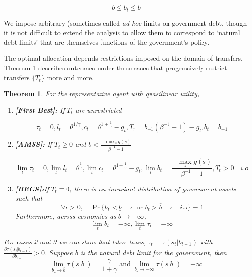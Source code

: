 \documentclass[thmsb,11pt]{article}
\newtheorem{theorem}{Theorem}
\begin{document}
\begin{equation}
\label{eq bounds}
\underline{b}\leq b_t\leq \overline{b}
\end{equation}

We impose arbitrary (sometimes called {\em ad hoc} limits on government debt, though it is not difficult to extend the analysis to allow
them to correspond to `natural debt limits' that are themselves functions  of the government's policy.

The optimal allocation depends  restrictions imposed on the domain of transfers. Theorem \ref{thm rep agent} describes outcomes under three cases that progressively restrict transfers $\{T_t\}$ more and more.


\begin{theorem}
\label{thm rep agent}
For the representative agent with quasilinear utility,

\begin{enumerate}


\item \textbf{[First Best]:} If $T_t$ are unrestricted

\[\tau_t=0,l_t=\theta^{1/\gamma},c_t=\theta^{1+ \frac{1}{\gamma}}-g_t,T_t=b_{-1}(\beta^{-1}-1)-g_t,b_t=b_{-1}\]


\item \textbf{[AMSS]:} If $T_t\geq 0$ and $\underline{b}<\frac{-\max_{s}g(s)}{\beta^{-1}-1}$

\[\lim_t \tau_t=0, \lim_t l_t=\theta^{\frac{1}{\gamma}},\lim_t c_t=\theta^{1+ \frac{1}{\gamma}}-g_t, \lim_t b_t=\frac{-\max_{s}g(s)}{\beta^{-1}-1}, T_t>0 \quad i.o\]
\item \textbf{[BEGS]:}If $T_t\equiv 0$, there is an invariant distribution of government assets such that
\[\forall \epsilon>0, \quad \Pr\{b_t<\underline{b}+\epsilon  \ \text{ or } b_t>\overline{b}-\epsilon \quad i.o \}=1\]
Furthermore,  across economies as $\underline{b}\to -\infty$,
\[\lim_t b_t=-\infty, \lim_t \tau_t=-\infty\]

\end{enumerate}
For cases 2 and 3 we can show that labor taxes, $\tau_t=\tau(s_t|b_{t-1})$ with $\frac{\partial  \tau(s_{t}|b_{t-1})}{\partial b_{t-1}}>0$. Suppose $\overline{b}$ is the natural debt limit for the government, then
\[\lim_{b\_ \to \overline{b}}\tau (s
|b\_)=\frac{\gamma}{1+\gamma} \text{ and } \lim_{b\_ \to -\infty}\tau (s|b\_)=-\infty\]
\end{theorem}
\end{document}
